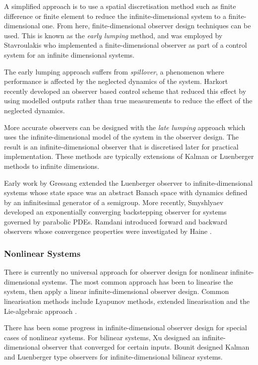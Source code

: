 A simplified approach is to use a spatial discretisation method such as finite difference or finite element to reduce the infinite-dimensional system to a finite-dimensional one. From here, finite-dimensional observer design techniques can be used. This is known as the \textit{early lumping} method, and was employed by Stavroulakis \cite{stavroulakis1973design} who implemented a finite-dimensional observer as part of a control system for an infinite dimensional systems.

The early lumping approach suffers from \textit{spillover}, a phenomenon where performance is affected by the neglected dynamics of the system\cite{meirovitch1983problem}. Harkort \cite{harkort2011finite} recently developed an observer based control scheme that reduced this effect by using modelled outputs rather than true measurements to reduce the effect of the neglected dynamics.

More accurate observers can be designed with the \textit{late lumping} approach which uses the infinite-dimensional model of the system in the observer design. The result is an infinite-dimensional observer that is discretised later for practical implementation. These methods are typically extensions of Kalman or Luenberger methods to infinite dimensions. 

Early work by Gressang \cite{gressang1975observers} extended the Luenberger observer to infinite-dimensional systems whose state space was an abstract Banach space with dynamics defined by an infinitesimal generator of a semigroup. More recently, Smyshlyaev \cite{smyshlyaev2005backstepping} developed an exponentially converging backstepping observer for systems governed by parabolic PDEs. Ramdani introduced forward and backward observers \cite{ramdani2010recovering} whose convergence properties were investigated by Haine \cite{haine2014recovering}.

\subsubsection{Nonlinear Systems}
There is currently no universal approach for observer design for nonlinear infinite-dimensional systems.
The most common approach has been to linearise the system, then apply a linear infinite-dimensional observer design. Common linearisation methods include Lyapunov methods, extended linearisation and the Lie-algebraic approach \cite{primbs1996survey}.

There has been some progress in infinite-dimensional observer design for special cases of nonlinear systems. For bilinear systems, Xu \cite{xu1995observer} designed an infinite-dimensional observer that converged for certain inputs. Bounit \cite{bounit1997observers} designed Kalman and Luenberger type observers for infinite-dimensional bilinear systems. 


